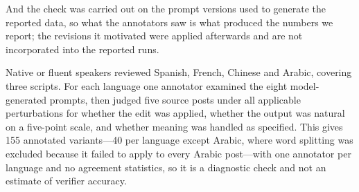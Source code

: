 
And the check was carried out on the prompt versions used to generate the
reported data, so what the annotators saw is what produced the numbers we
report; the revisions it motivated were applied afterwards and are not
incorporated into the reported runs.




Native or fluent speakers reviewed Spanish, French, Chinese and Arabic,
covering three scripts. For each language one annotator examined the
eight model-generated prompts, then judged five source posts under all
applicable perturbations for whether the edit was applied, whether the
output was natural on a five-point scale, and whether meaning was handled
as specified. This gives 155 annotated variants---40 per language except
Arabic, where word splitting was excluded because it failed to apply to
every Arabic post---with one annotator per language and no agreement
statistics, so it is a diagnostic check and not an estimate of verifier
accuracy.

